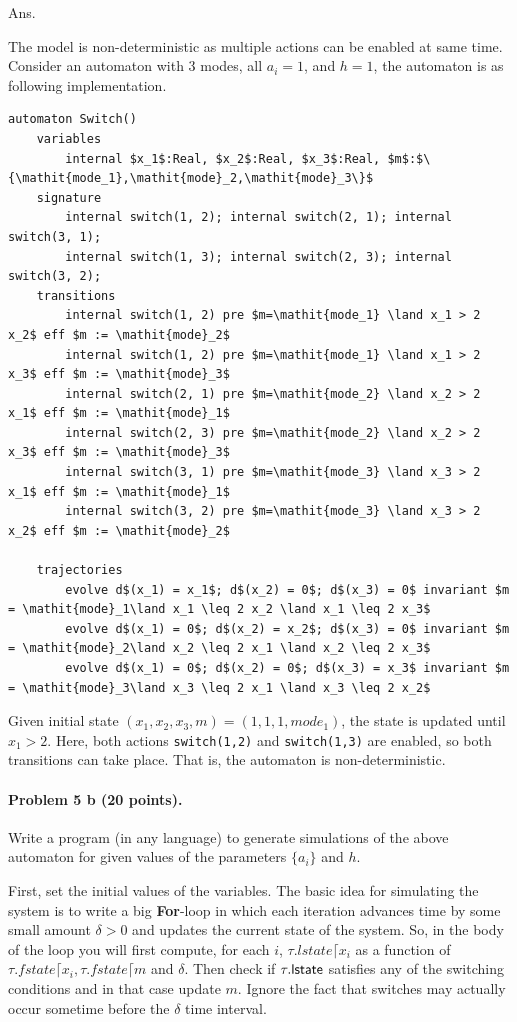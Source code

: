 \documentclass[11pt]{article}
\begin{document}
Ans.

The model is non-deterministic as multiple actions can be enabled at same time.
Consider an automaton with 3 modes, all $a_i = 1$, and $h = 1$,
the automaton is as following implementation.

\begin{lstlisting}[language=ioaLang, mathescape=true]
automaton Switch()
    variables
        internal $x_1$:Real, $x_2$:Real, $x_3$:Real, $m$:$\{\mathit{mode_1},\mathit{mode}_2,\mathit{mode}_3\}$
    signature
        internal switch(1, 2); internal switch(2, 1); internal switch(3, 1);
        internal switch(1, 3); internal switch(2, 3); internal switch(3, 2);
    transitions
        internal switch(1, 2) pre $m=\mathit{mode_1} \land x_1 > 2 x_2$ eff $m := \mathit{mode}_2$
        internal switch(1, 2) pre $m=\mathit{mode_1} \land x_1 > 2 x_3$ eff $m := \mathit{mode}_3$
        internal switch(2, 1) pre $m=\mathit{mode_2} \land x_2 > 2 x_1$ eff $m := \mathit{mode}_1$
        internal switch(2, 3) pre $m=\mathit{mode_2} \land x_2 > 2 x_3$ eff $m := \mathit{mode}_3$
        internal switch(3, 1) pre $m=\mathit{mode_3} \land x_3 > 2 x_1$ eff $m := \mathit{mode}_1$
        internal switch(3, 2) pre $m=\mathit{mode_3} \land x_3 > 2 x_2$ eff $m := \mathit{mode}_2$

    trajectories
        evolve d$(x_1) = x_1$; d$(x_2) = 0$; d$(x_3) = 0$ invariant $m = \mathit{mode}_1\land x_1 \leq 2 x_2 \land x_1 \leq 2 x_3$
        evolve d$(x_1) = 0$; d$(x_2) = x_2$; d$(x_3) = 0$ invariant $m = \mathit{mode}_2\land x_2 \leq 2 x_1 \land x_2 \leq 2 x_3$
        evolve d$(x_1) = 0$; d$(x_2) = 0$; d$(x_3) = x_3$ invariant $m = \mathit{mode}_3\land x_3 \leq 2 x_1 \land x_3 \leq 2 x_2$
\end{lstlisting}

Given initial state $(x_1,x_2,x_3,m) = (1, 1, 1, \mathit{mode}_1)$,
the state is updated until $x_1 > 2$.
Here, both actions \texttt{switch(1,2)} and \texttt{switch(1,3)} are enabled,
so both transitions can take place.
That is, the automaton is non-deterministic.

\paragraph{Problem 5 b (20 points).}
Write a program (in any language) to generate simulations of the above automaton for given values of the parameters $\{a_i\}$ and $h$.

First, set the initial values of the variables.
The basic idea for simulating the system is to write a big {\bf For\/}-loop in which each iteration advances time by some small amount $\delta >0$ and updates the current state of the system.
So, in the body of the loop you will first compute, for each $i$, $\tau.lstate \lceil x_i$ as a function of  $\tau.fstate \lceil x_i, \tau.fstate \lceil m$ and $\delta$.
Then check if $\tau.{\sf lstate}$ satisfies any of the switching conditions and in that case update $m$. Ignore the fact that switches may actually occur sometime before the $\delta$ time interval.
 
\end{document}
